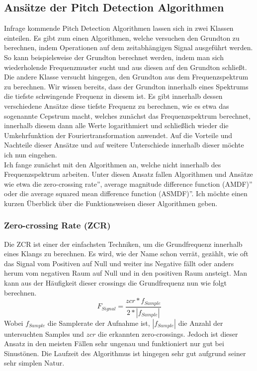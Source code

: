 \subsection{Ansätze der Pitch Detection Algorithmen}
Infrage kommende Pitch Detection Algorithmen lassen sich in zwei Klassen einteilen. Es gibt zum einen Algorithmen, welche versuchen den Grundton zu berechnen, indem Operationen auf dem zeitabhängigen Signal ausgeführt werden. So kann beispielsweise der Grundton berechnet werden, indem man sich wiederholende Frequenzmuster sucht und aus diesen auf den Grundton schließt. \cite{cuadra2001hps}
Die andere Klasse versucht hingegen, den Grundton aus dem Frequenzspektrum zu berechnen. Wir wissen bereits, dass der Grundton innerhalb eines Spektrums die tiefste schwingende Frequenz in diesem ist. Es gibt innerhalb dessen verschiedene Ansätze diese tiefste Frequenz zu berechnen, wie es etwa das sogenannte Cepstrum macht, welches zunächst das Frequenzspektrum berechnet, innerhalb diesem dann alle Werte logarithmiert und schließlich wieder die Umkehrfunktion der Fouriertransformation anwendet. Auf die Vorteile und Nachteile dieser Ansätze und auf weitere Unterschiede innerhalb dieser möchte ich nun eingehen. \\
Ich fange zunächst mit den Algorithmen an, welche nicht innerhalb des Frequenzspektrum arbeiten. Unter diesen Ansatz fallen Algorithmen und Ansätze wie etwa die \glqq zero-crossing rate'', \glqq average magnitude difference function (AMDF)'' oder die \glqq average squared mean difference function (ASMDF)''. Ich möchte einen kurzen Überblick über die Funktionsweisen dieser Algorithmen geben.

\subsubsection*{Zero-crossing Rate (ZCR)}
Die ZCR ist einer der einfachsten Techniken, um die Grundfrequenz innerhalb eines Klangs zu berechnen. Es wird, wie der Name schon verrät, gezählt, wie oft das Signal vom Positiven auf Null und weiter ins Negative fällt oder anders herum vom negativen Raum auf Null und in den positiven Raum ansteigt. Man kann aus der Häufigkeit dieser crossings die Grundfrequenz nun wie folgt berechnen. 
$$ F_{Signal} = \frac{zcr * f_{Sample}}{2 * |f_{Sample}|}$$
Wobei $f_{Sample}$ die Samplerate der Aufnahme ist, $|f_{Sample}|$ die Anzahl der untersuchten Samples und $zcr$ die erkannten zero-crossings. Jedoch ist dieser Ansatz in den meisten Fällen sehr ungenau und funktioniert nur gut bei Sinustönen. Die Laufzeit des Algorithmus ist hingegen sehr gut aufgrund seiner sehr simplen Natur. \cite{amado2008pitch}

